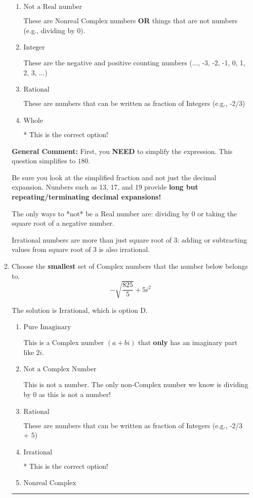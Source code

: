 \documentclass{extbook}[14pt]
\newcommand{\litem}[1]{\item #1

\rule{\textwidth}{0.4pt}}
\begin{document}
\begin{enumerate}
{\begin{enumerate}[label=\Alph*.]
These cannot be written as a fraction of Integers.
\item \( \text{Not a Real number} \)

These are Nonreal Complex numbers \textbf{OR} things that are not numbers (e.g., dividing by 0).
\item \( \text{Integer} \)

These are the negative and positive counting numbers (..., -3, -2, -1, 0, 1, 2, 3, ...)
\item \( \text{Rational} \)

These are numbers that can be written as fraction of Integers (e.g., -2/3)
\item \( \text{Whole} \)

* This is the correct option!
\end{enumerate}

\textbf{General Comment:} First, you \textbf{NEED} to simplify the expression. This question simplifies to $180$. 
 
 Be sure you look at the simplified fraction and not just the decimal expansion. Numbers such as 13, 17, and 19 provide \textbf{long but repeating/terminating decimal expansions!} 
 
 The only ways to *not* be a Real number are: dividing by 0 or taking the square root of a negative number. 
 
 Irrational numbers are more than just square root of 3: adding or subtracting values from square root of 3 is also irrational.
}
\litem{
Choose the \textbf{smallest} set of Complex numbers that the number below belongs to.
\[ -\sqrt{\frac{825}{5}}+5i^2 \]

The solution is \( \text{Irrational} \), which is option D.\begin{enumerate}[label=\Alph*.]
\item \( \text{Pure Imaginary} \)

This is a Complex number $(a+bi)$ that \textbf{only} has an imaginary part like $2i$.
\item \( \text{Not a Complex Number} \)

This is not a number. The only non-Complex number we know is dividing by 0 as this is not a number!
\item \( \text{Rational} \)

These are numbers that can be written as fraction of Integers (e.g., -2/3 + 5)
\item \( \text{Irrational} \)

* This is the correct option!
\item \( \text{Nonreal Complex} \)


\end{enumerate}}
\end{enumerate}
\end{document}

